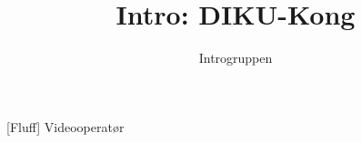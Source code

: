 \documentclass[a4paper,11pt]{article}
\title{Intro: DIKU-Kong}
\author{Introgruppen}
\begin{document}
\maketitle

\begin{roles}
[Fluff] Videooperatør
\end{roles}

\begin{sketch}

\end{sketch}
\end{document}
